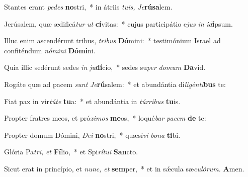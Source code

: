 \item Stantes erant \textit{pedes} \textbf{no}stri,~* in átriis \textit{tuis,} \hspace{0.03em}\textit{Je}\textbf{rú}\textbf{sa}lem.
\item Jerúsalem, quæ ædificá\hspace{0.03em}\textit{tur} \textit{ut} \textbf{cí}vitas:~* cujus participátio e\textit{jus} \textit{in} \textit{id}\textbf{í}psum.
\item Illuc enim ascendérunt tribus, \textit{tribus} \textbf{Dó}mini:~* testimónium Israel ad confiténdum \textit{nómini} \textbf{Dó}\textbf{mi}ni.
\item Quia illic sedérunt sedes \textit{in} \textit{ju}\textbf{dí}cio,~* sedes su\hspace{0.03em}\textit{per} \textit{domum} \textbf{Da}vid.
\item Rogáte quæ ad pacem \textit{sunt} \textit{Je}\textbf{rú}salem:~* et abundántia di\hspace{0.03em}\textit{ligénti}\textbf{bus} te:
\item Fiat pax in vir\textit{túte} \textbf{tu}a:~* et abundántia in \textit{túrribus} \textbf{tu}is.
\item Propter fratres meos, et pró\hspace{0.03em}\textit{ximos} \textbf{me}os,~* loqué\hspace{0.03em}\textit{bar} \textit{pacem} \textbf{de} te:
\item Propter domum Dómini, \textit{Dei} \textbf{no}stri,~* quæsí\textit{vi} \textit{bona} \textbf{ti}bi.
\item Glória Pa\hspace{0.03em}\textit{tri,} \textit{et} \textbf{Fí}lio,~* et Spi\hspace{0.03em}\textit{rítui} \textbf{San}cto.
\item Sicut erat in princípio, et \textit{nunc,} \textit{et} \textbf{sem}per,~* et in sǽcula sæ\hspace{0.03em}\textit{culórum.} \textbf{A}men.